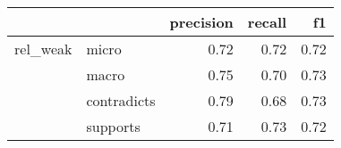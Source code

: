 \begin{tabular}{llrrr}
\toprule
         &          &  precision &  recall &   f1 \\
\midrule
rel\_weak & micro &       0.72 &    0.72 & 0.72 \\
         & macro &       0.75 &    0.70 & 0.73 \\
         & contradicts &       0.79 &    0.68 & 0.73 \\
         & supports &       0.71 &    0.73 & 0.72 \\
\bottomrule
\end{tabular}
